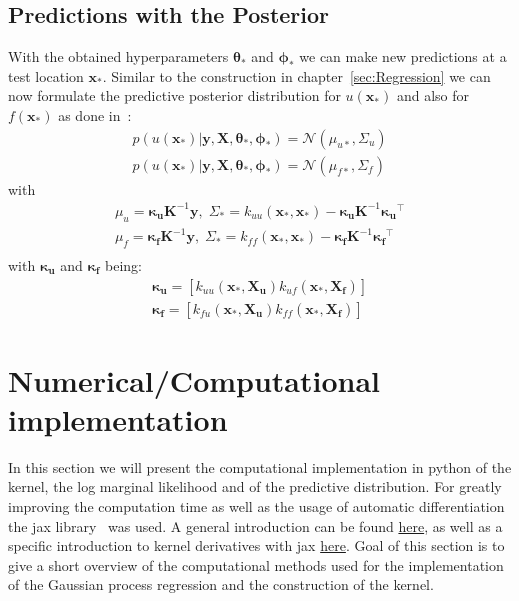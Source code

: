 \documentclass{article}
\begin{document}
\subsection{Predictions with the Posterior}
With the obtained hyperparameters $\bm{\theta_*}$ and $\bm{\phi_*}$ we can make new predictions at a test location $\bm{x_*}$. Similar to the construction in chapter~\ref{sec:Regression} we can now formulate the predictive posterior distribution for $u(\bm{x_*})$ and also for $f(\bm{x_*})$ as done
in~\cite{RAISSI}:
\begin{equation}
    \begin{aligned}
        p(u(\bm{x_*})|\bm{y},\bm{X},\bm{\theta_*}, \bm{\phi_*}) = \mathcal{N}(\mu_{u*}, \Sigma_u) \\
        p(u(\bm{x_*})|\bm{y},\bm{X},\bm{\theta_*}, \bm{\phi_*}) = \mathcal{N}(\mu_{f*}, \Sigma_f)
    \end{aligned}
\end{equation}
with
\begin{equation}
    \begin{aligned}
        \label{eq:predictive_mean_cov}
        \mu_u = \bm{\kappa_u}\bm{K}^{-1}\bm{y}, \; \Sigma_* = k_{uu}(\bm{x_*,x_*}) - \bm{\kappa_u}\bm{K}^{-1}\bm{\kappa_u}^\intercal  \\
        \mu_f = \bm{\kappa_f}\bm{K}^{-1}\bm{y}, \;  \Sigma_* = k_{ff}(\bm{x_*,x_*}) - \bm{\kappa_f}\bm{K}^{-1}\bm{\kappa_f}^\intercal \\
    \end{aligned}
\end{equation}
with $\bm{\kappa_u}$ and $\bm{\kappa_f}$ being:
\begin{equation}
    \begin{aligned}
        \bm{\kappa_u} = [k_{uu}(\bm{x_*},\bm{X_u})k_{uf}(\bm{x_*,\bm{X_f}})] \\
        \bm{\kappa_f} = [k_{fu}(\bm{x_*},\bm{X_u})k_{ff}(\bm{x_*,\bm{X_f}})]
    \end{aligned}
\end{equation}

\section{Numerical/Computational implementation}
In this section we will present the computational implementation in python of the kernel, the log marginal likelihood and of the predictive distribution. For greatly improving the computation time as well as the usage of automatic differentiation the jax library~\cite{jax2018github} was used. A general introduction can be found \href{https://jax.readthedocs.io/en/latest/notebooks/quickstart.html}{here}, as well as a specific introduction to kernel derivatives with jax \href{https://jejjohnson.github.io/research_notebook/content/notes/kernels/kernel_derivatives.html}{here}. Goal of this section is to give a short overview of the computational methods used for the implementation of the Gaussian process regression and the construction of the kernel.\\
\end{document}
